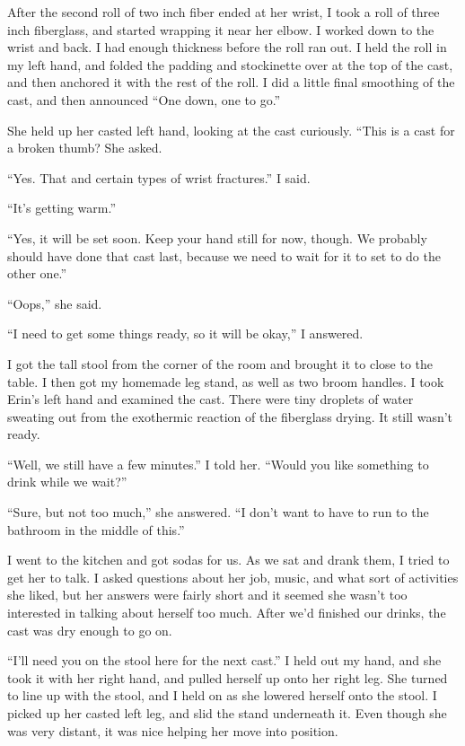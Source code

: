 After the second roll of two inch fiber ended at her wrist, I took a roll of three inch
fiberglass, and started wrapping it near her elbow. I worked down to the wrist and back. I had
enough thickness before the roll ran out. I held the roll in my left hand, and folded the
padding and stockinette over at the top of the cast, and then anchored it with the rest of the
roll. I did a little final smoothing of the cast, and then announced ``One down, one to go.''

She held up her casted left hand, looking at the cast curiously. ``This is a cast for a
broken thumb? She asked.

``Yes. That and certain types of wrist fractures.'' I said.

``It's getting warm.''

``Yes, it will be set soon. Keep your hand still for now, though. We probably should have
done that cast last, because we need to wait for it to set to do the other one.''

``Oops,'' she said.

``I need to get some things ready, so it will be okay,'' I answered.

I got the tall stool from the corner of the room and brought it to close to the table. I
then got my homemade leg stand, as well as two broom handles. I took Erin's left hand and
examined the cast. There were tiny droplets of water sweating out from the exothermic reaction
of the fiberglass drying. It still wasn't ready.

``Well, we still have a few minutes.'' I told her. ``Would you like something to drink
while we wait?''

``Sure, but not too much,'' she answered. ``I don't want to have to run to the bathroom in
the middle of this.''

I went to the kitchen and got sodas for us. As we sat and drank them, I tried to get her
to talk. I asked questions about her job, music, and what sort of activities she liked, but her
answers were fairly short and it seemed she wasn't too interested in talking about herself too
much. After we'd finished our drinks, the cast was dry enough to go on.

``I'll need you on the stool here for the next cast.'' I held out my hand, and she took it
with her right hand, and pulled herself up onto her right leg. She turned to line up with the
stool, and I held on as she lowered herself onto the stool. I picked up her casted left leg, and
slid the stand underneath it. Even though she was very distant, it was nice helping her move
into position.

